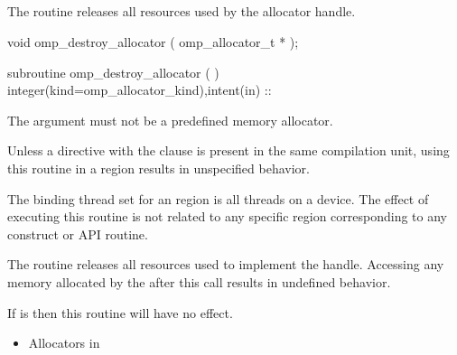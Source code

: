 \subsection{}
\label{subsec:omp_destroy_allocator}

\summary
The  routine releases all resources used by the allocator handle.

\format
\begin{ccppspecific}
\begin{ompcFunction}
void omp_destroy_allocator ( omp_allocator_t * );
\end{ompcFunction}
\end{ccppspecific}
\begin{fortranspecific}
\begin{ompfSubroutine}
subroutine omp_destroy_allocator (  )
integer(kind=omp_allocator_kind),intent(in) :: 
\end{ompfSubroutine}
\end{fortranspecific}

\constraints

The  argument must not be a predefined memory allocator.

Unless a  directive with the  clause is present in the same compilation unit, using this routine in a  region results in unspecified behavior.

\binding

The binding thread set for an  region is all threads on a device.
The effect of executing this routine is not related to any specific region corresponding to any construct or API routine.

\effect

The  routine releases all resources used to implement the  handle. Accessing any memory allocated by the  after this call results in undefined behavior.

If  is  then this routine will have no effect.
 
\crossreferences
\begin{itemize}
\item Allocators in 
\end{itemize}


